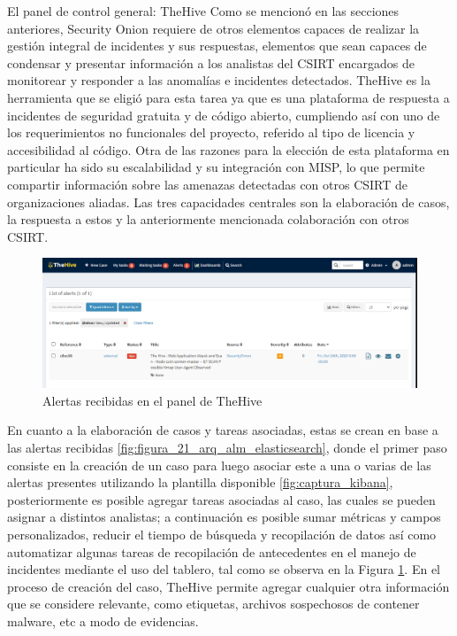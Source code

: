    \pagebreak
   \begin{section}{El panel de control general: TheHive }
     Como se mencionó en las secciones anteriores, Security Onion requiere de otros elementos capaces de realizar la gestión integral de incidentes y sus respuestas, elementos que sean capaces de condensar y presentar información a los analistas del CSIRT encargados de monitorear y responder a las anomalías e incidentes detectados.  TheHive es la herramienta que se eligió para esta tarea ya que es una plataforma de respuesta a incidentes de seguridad gratuita y de código abierto, cumpliendo así con uno de los requerimientos no funcionales del proyecto, referido al tipo de licencia y accesibilidad al código. Otra de las razones para la elección de esta plataforma en particular ha sido su escalabilidad y su integración con MISP, lo que permite compartir información sobre las amenazas detectadas con otros CSIRT de organizaciones aliadas. Las tres capacidades centrales son la elaboración de casos, la respuesta a estos y la anteriormente mencionada colaboración con otros CSIRT.\par
     \begin{figure}[H]
        \centering
        \includegraphics[width=1\textwidth]{./descripcion_sonion_imagenes/figura_23_alerta_panel_thehive.png}
        \caption{ Alertas recibidas en el panel de TheHive\cite{thehive}}
        \label{fig:alerta_panel_thehive}
     \end{figure}
        \FloatBarrier
        En cuanto a la elaboración de casos y tareas asociadas, estas se crean en base a las alertas recibidas \ref{fig:figura_21_arq_alm_elasticsearch}, donde el primer paso consiste en la creación de un caso para luego asociar este a una o varias de las alertas presentes utilizando la plantilla disponible \ref{fig:captura_kibana}, posteriormente es posible agregar tareas asociadas al caso, las cuales se pueden asignar a distintos analistas; a continuación es posible sumar métricas y campos personalizados, reducir el tiempo de búsqueda y recopilación de datos así como automatizar algunas tareas de recopilación de antecedentes en el manejo de incidentes mediante el uso del tablero, tal como se observa en la Figura \ref{fig:alerta_panel_thehive}. En el proceso de creación del caso, TheHive permite agregar cualquier otra información que se considere relevante, como etiquetas, archivos sospechosos de contener malware, etc a modo de evidencias.

\end{section}
